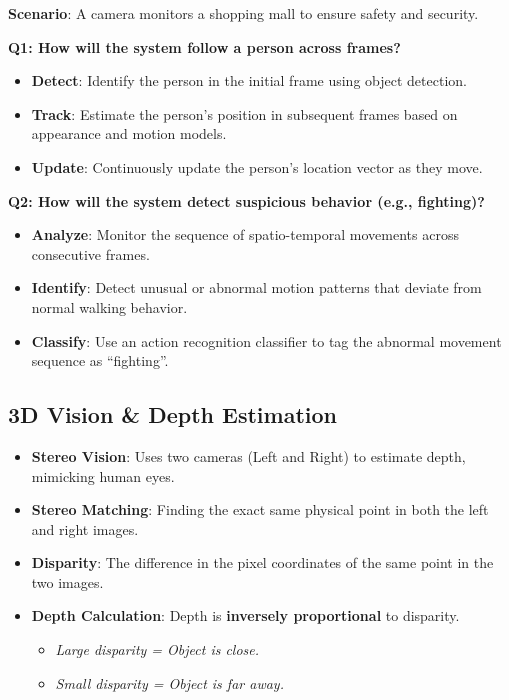 \documentclass[11pt,a4paper]{article}
\begin{document}
\begin{tcolorbox}[colback=green!5!white,colframe=green!50!black,title=\textbf{Case Study: CCTV Surveillance System}]
\textbf{Scenario}: A camera monitors a shopping mall to ensure safety and security.

\textbf{Q1: How will the system follow a person across frames?}
\begin{itemize}
    \item \textbf{Detect}: Identify the person in the initial frame using object detection.
    \item \textbf{Track}: Estimate the person's position in subsequent frames based on appearance and motion models.
    \item \textbf{Update}: Continuously update the person's location vector as they move.
\end{itemize}

\textbf{Q2: How will the system detect suspicious behavior (e.g., fighting)?}
\begin{itemize}
    \item \textbf{Analyze}: Monitor the sequence of spatio-temporal movements across consecutive frames.
    \item \textbf{Identify}: Detect unusual or abnormal motion patterns that deviate from normal walking behavior.
    \item \textbf{Classify}: Use an action recognition classifier to tag the abnormal movement sequence as ``fighting''.
\end{itemize}
\end{tcolorbox}

\subsection{3D Vision \& Depth Estimation}
\begin{itemize}
    \item \textbf{Stereo Vision}: Uses two cameras (Left and Right) to estimate depth, mimicking human eyes.
    \item \textbf{Stereo Matching}: Finding the exact same physical point in both the left and right images.
    \item \textbf{Disparity}: The difference in the pixel coordinates of the same point in the two images.
    \item \textbf{Depth Calculation}: Depth is \textbf{inversely proportional} to disparity. 
    \begin{itemize}
        \item \textit{Large disparity = Object is close.}
        \item \textit{Small disparity = Object is far away.}
    \end{itemize}
\end{itemize}
\end{document}
